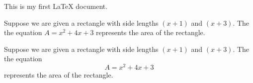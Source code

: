 \documentclass[8pt]{article}
\begin{document}
This is my first LaTeX document.

Suppose we are given a rectangle with side lengths $(x+1)$ and $(x+3)$. The the equation $A=x^2+4x+3$ represents the area of the rectangle.

Suppose we are given a rectangle with side lengths $(x+1)$ and $(x+3)$. The the equation $$A=x^2+4x+3$$ represents the area of the rectangle.
\end{document}

